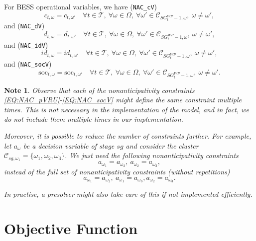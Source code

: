\documentclass{article}
\newcommand{\soc}{\text{soc}}
\newtheorem{note}{Note}[section]
\begin{document}
For BESS operational variables, we have (\verb|NAC_cV|)
\begin{equation} \label{EQ:NAC_cV}
	c_{t, \omega} = c_{t, \omega'} \quad \forall t \in \mathcal{T}, \ \forall \omega \in \Omega, \ \forall \omega' \in \mathcal{C}_{SG^{WP}_t - 1, \omega}, \ \omega \neq \omega',
\end{equation}
and (\verb|NAC_dV|)
\begin{equation} \label{EQ:NAC_dV}
	d_{t, \omega} = d_{t, \omega'} \quad \forall t \in \mathcal{T}, \ \forall \omega \in \Omega, \ \forall \omega' \in \mathcal{C}_{SG^{WP}_t - 1, \omega}, \ \omega \neq \omega',
\end{equation}
and (\verb|NAC_idV|)
\begin{equation} \label{EQ:NAC_idV}
	id_{t, \omega} = id_{t, \omega'} \quad \forall t \in \mathcal{T}, \ \forall \omega \in \Omega, \ \forall \omega' \in \mathcal{C}_{SG^{WP}_t - 1, \omega}, \ \omega \neq \omega',
\end{equation}
and (\verb|NAC_socV|)
\begin{equation} \label{EQ:NAC_socV}
	\soc_{t, \omega} = \soc_{t, \omega'} \quad \forall t \in \mathcal{T}, \ \forall \omega \in \Omega, \ \forall \omega' \in \mathcal{C}_{SG^{WP}_t - 1, \omega}, \ \omega \neq \omega'.
\end{equation}

\begin{note}
Observe that each of the nonanticipativity constraints \eqref{EQ:NAC_pVRU}-\eqref{EQ:NAC_socV} might define the same constraint multiple times. This is not necessary in the implementation of the model, and in fact, we do not include them multiple times in our implementation.
	
Moreover, it is possible to reduce the number of constraints further. For example, let $a_{\omega}$ be a decision variable of stage $sg$ and consider the cluster $\mathcal{C}_{sg, \omega_1} = \{ \omega_1, \omega_2, \omega_3 \}$. We just need the following nonanticipativity constraints 
$$
a_{\omega_1} = a_{\omega_2}, \ a_{\omega_2} = a_{\omega_3},
$$
instead of the full set of nonanticipativity constraints (without repetitions)
$$
a_{\omega_1} = a_{\omega_2}, \ a_{\omega_1} = a_{\omega_3}, a_{\omega_2} = a_{\omega_3}.
$$

In practise, a presolver might also take care of this if not implemented efficiently.	
\end{note}


\section{Objective Function}
\label{SEC:ObjectiveFunction}
\end{document}
